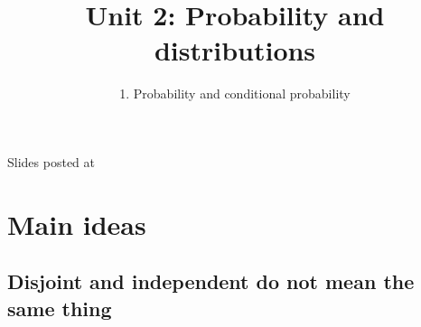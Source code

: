 \documentclass[slidestop,compress,mathserif,11pt,t,professionalfonts,xcolor=table]{beamer}
\title{Unit 2: Probability and distributions}
\subtitle{1. Probability and conditional probability}
\author{\CourseName}
\date{}
\institute{\InstituteName}
\begin{document}



\begin{frame}[plain]

\titlepage

\vfill

{\scriptsize {} \hfill Slides posted at  \webURL{\CourseSite}}

\addtocounter{framenumber}{-1} 

\end{frame}




%
%
%
%
%
%

\section{Main ideas}


\subsection{Disjoint and independent do not mean the same thing}
\label{mi1}

\end{document}
